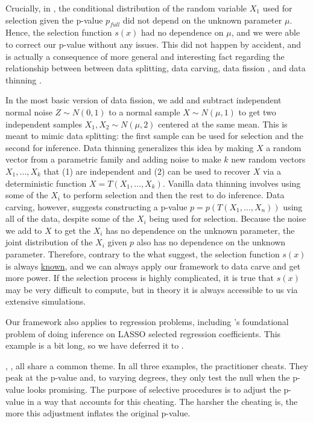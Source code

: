 \documentclass{article}
\begin{document}
Crucially, in , the conditional distribution of the random variable $X_1$ used for selection given the p-value $p_{full}$ did not depend on the unknown parameter $\mu$. Hence, the selection function $s(x)$ had no dependence on $\mu$, and we were able to correct our p-value without any issues. This did not happen by accident, and is actually a consequence of more general and interesting fact regarding the relationship between between data splitting, data carving, data fission \citep{Leiner}, and data thinning \citep{Dharamshi, Neufeld}.

In the most basic version of data fission, we add and subtract independent normal noise $Z \sim N(0, 1)$ to a normal sample $X \sim N(\mu, 1)$ to get two independent samples $X_1, X_2 \sim N(\mu, 2)$ centered at the same mean. This is meant to mimic data splitting: the first sample can be used for selection and the second for inference. Data thinning generalizes this idea by making $X$ a random vector from a parametric family and adding noise to make $k$ new random vectors $X_1, \dots, X_k$ that (1) are independent and (2) can be used to recover $X$ via a deterministic function $X = T(X_1, \dots, X_k)$. Vanilla data thinning involves using some of the $X_i$ to perform selection and then the rest to do inference. Data carving, however, suggests constructing a p-value $p = p(T(X_1, \dots, X_n))$ using all of the data, despite some of the $X_i$ being used for selection. Because the noise we add to $X$ to get the $X_i$ has no dependence on the unknown parameter, the joint distribution of the $X_i$ given $p$ also has no dependence on the unknown parameter. Therefore, contrary to the what \cite{Leiner} suggest, the selection function $s(x)$ is always \underline{known}, and we can always apply our framework to data carve and get more power. If the selection process is highly complicated, it is true that $s(x)$ may be very difficult to compute, but in theory it is always accessible to us via extensive simulations. 

Our framework also applies to regression problems, including \cite{Lee2016}'s foundational problem of doing inference on LASSO selected regression coefficients. This example is a bit long, so we have deferred it to .  

, ,  all share a common theme. In all three examples, the practitioner cheats. They peak at the p-value and, to varying degrees, they only test the null when the p-value looks promising. The purpose of selective procedures is to adjust the p-value in a way that accounts for this cheating. The harsher the cheating is, the more this adjustment inflates the original p-value. 
\end{document}
